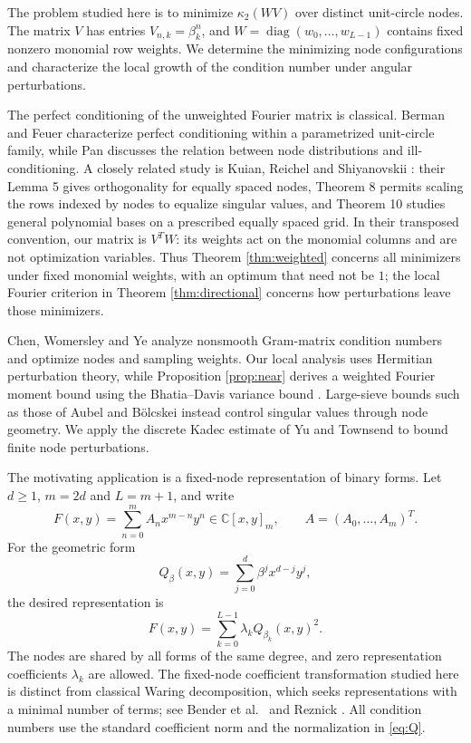 \documentclass[10pt,twoside,final]{siamart1116}
\numberwithin{equation}{section}
\numberwithin{theorem}{section}
\newcommand{\C}{\mathbb C}
\newcommand{\diag}{\operatorname{diag}}
\newcommand{\cond}{\kappa_2}
\begin{document}
The problem studied here is to minimize $\cond(WV)$ over distinct unit-circle
nodes. The matrix $V$ has entries $V_{n,k}=\beta_k^n$, and
$W=\diag(w_0,\ldots,w_{L-1})$ contains fixed nonzero monomial row weights.
We determine the minimizing node configurations and characterize the local growth
of the condition number under angular perturbations.

The perfect conditioning of the unweighted Fourier matrix is classical.
Berman and Feuer \cite[Lemma 3.1]{berman} characterize perfect conditioning within a
parametrized unit-circle family, while Pan \cite{pan} discusses the relation between
node distributions and ill-conditioning. A closely related study is Kuian, Reichel
and Shiyanovskii \cite{kuian}: their Lemma 5 gives orthogonality for equally spaced
nodes, Theorem 8 permits scaling the rows indexed by nodes to equalize singular
values, and Theorem 10 studies general polynomial bases on a prescribed equally
spaced grid. In their transposed convention, our matrix is $V^TW$: its weights act on
the monomial columns and are not optimization variables. Thus Theorem
\ref{thm:weighted} concerns all minimizers under fixed monomial weights, with an
optimum that need not be $1$; the local Fourier criterion in Theorem
\ref{thm:directional} concerns how perturbations leave those minimizers.

Chen, Womersley and Ye \cite[Sections 2 and 4]{chen} analyze nonsmooth Gram-matrix
condition numbers and optimize nodes and sampling weights. Our local analysis uses
Hermitian perturbation theory, while Proposition \ref{prop:near} derives a weighted
Fourier moment bound using the Bhatia--Davis
variance bound \cite{bhatia}. Large-sieve bounds such as those of Aubel
and B\"olcskei \cite{aubel} instead control singular values through node geometry.
We apply the discrete Kadec estimate of Yu and Townsend \cite{yu} to bound finite
node perturbations.

The motivating application is a fixed-node representation of binary forms. Let
$d\ge1$, $m=2d$ and $L=m+1$, and write
\begin{equation}\label{eq:F}
F(x,y)=\sum_{n=0}^{m}A_nx^{m-n}y^n\in\C[x,y]_m,
\qquad A=(A_0,\ldots,A_m)^T.
\end{equation}
For the geometric form
\begin{equation}\label{eq:Q}
Q_\beta(x,y)=\sum_{j=0}^{d}\beta^j x^{d-j}y^j,
\end{equation}
the desired representation is
\begin{equation}\label{eq:representation}
F(x,y)=\sum_{k=0}^{L-1}\lambda_kQ_{\beta_k}(x,y)^2.
\end{equation}
The nodes are shared by all forms of the same degree, and zero representation coefficients $\lambda_k$ are allowed.
The fixed-node coefficient transformation studied here is distinct from classical
Waring decomposition, which seeks representations with a minimal number of terms; see
Bender et al.\ \cite{bender} and Reznick \cite{reznick}. All condition numbers use
the standard coefficient norm and the normalization in \eqref{eq:Q}.
\end{document}
